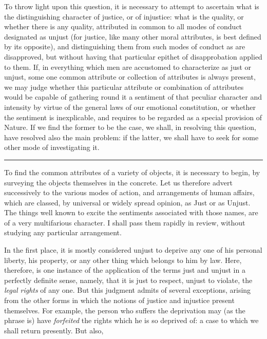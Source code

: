 \documentclass[12pt]{report}
\newcommand*{\xdash}[1][3em]{\rule[0.5ex]{#1}{0.55pt}}
\begin{document}
To throw light upon this question, it is necessary to attempt to ascertain what is the distinguishing character of justice, or of injustice: what is the quality, or whether there is any quality, attributed in common to all modes of conduct designated as unjust (for justice, like many other moral attributes, is best defined by its opposite), and distinguishing them from such modes of conduct as are disapproved, but without having that particular epithet of disapprobation applied to them. If, in everything which men are accustomed to characterize as just or unjust, some one common attribute or collection of attributes is always present, we may judge whether this particular attribute or combination of attributes would be capable of gathering round it a sentiment of that peculiar character and intensity by virtue of the general laws of our emotional constitution, or whether the sentiment is inexplicable, and requires to be regarded as a special provision of Nature. If we find the former to be the case, we shall, in resolving this question, have resolved also the main problem: if the latter, we shall have to seek for some other mode of investigating it.

\begin{center}
\xdash[22em]
\end{center}

To find the common attributes of a variety of objects, it is necessary to begin, by surveying the objects themselves in the concrete. Let us therefore advert successively to the various modes of action, and arrangements of human affairs, which are classed, by universal or widely spread opinion, as Just or as Unjust. The things well known to excite the sentiments associated with those names, are of a very multifarious character. I shall pass them rapidly in review, without studying any particular arrangement.

In the first place, it is mostly considered unjust to deprive any one of his personal liberty, his property, or any other thing which belongs to him by law. Here, therefore, is one instance of the application of the terms just and unjust in a perfectly definite sense, namely, that it is just to respect, unjust to violate, the \emph{legal rights} of any one. But this judgment admits of several exceptions, arising from the other forms in which the notions of justice and injustice present themselves. For example, the person who suffers the deprivation may (as the phrase is) have \emph{forfeited} the rights which he is so deprived of: a case to which we shall return presently. But also,
\end{document}
